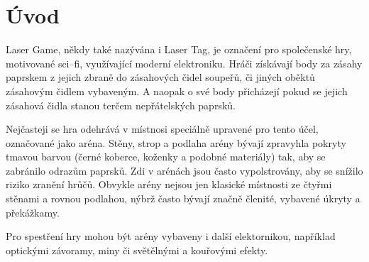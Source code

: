 \chapter*{Úvod}
{}

Laser Game, někdy také nazývána i Laser Tag, je označení pro společenské hry, motivované sci--fi, využívající moderní elektroniku. Hráči získávají body za zásahy  paprskem z jejich zbraně do zásahových čidel soupeřů, či jiných oběktů zásahovým čidlem vybaveným. A naopak o své body přicházejí pokud se jejich zásahová čidla stanou terčem nepřátelských  paprsků.

Nejčasteji se hra odehrává v místnosi speciálně upravené pro tento účel, označované jako aréna. Stěny, strop a podlaha arény bývají zpravyhla pokryty tmavou barvou (černé koberce, koženky a podobné materiály) tak, aby se zabránilo odrazům  paprsků. Zdi v arénách jsou často vypolstrovány, aby se snížilo riziko zranění hrůčů. Obvykle arény nejsou jen klasické místnosti ze čtyřmi stěnami a rovnou podlahou, nýbrž často bývají značně členité, vybavené úkryty a překážkamy.

Pro spestření hry mohou být arény vybaveny i další elektornikou, například optickými závoramy, miny či světělnými a kouřovými efekty.
